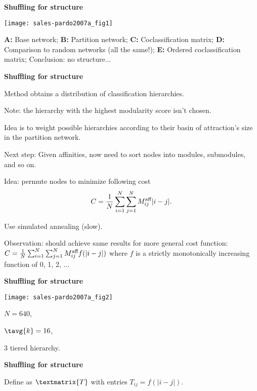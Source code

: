   \textbf{Shuffling for structure}

  \texttt{[image: sales-pardo2007a\_fig1]}

  
   
    \textbf{A:} 
    Base network;
    \textbf{B:} 
    Partition network;
    \textbf{C:} 
    Coclassification matrix;
    \textbf{D:} 
    Comparison to random networks (all the same!);
    \textbf{E:} 
    Ordered coclassification matrix;
    {
    Conclusion: no structure...
    }
  


  \textbf{Shuffling for structure}

  
   
    Method obtains a distribution of classification hierarchies.
  
    Note: the hierarchy with the highest modularity score
    isn't chosen.
  
    Idea is to weight possible hierarchies according
    to their basin of attraction's size in the partition network.
  
    \alert{Next step:} Given affinities, now need to
    sort nodes into modules, submodules, and so on.
  
    \alert{Idea:} permute nodes to minimize
    following cost
    $$
    C = \frac{1}{N} 
    \sum_{i=1}^{N}
    \sum_{j=1}^{N}
    M_{ij}^{\textnormal{aff}} | i - j|.
    $$
  
    Use simulated annealing (slow).
  
    \alert{Observation:} should achieve same results
    for more general cost function:
    $
    C = \frac{1}{N} 
    \sum_{i=1}^{N}
    \sum_{j=1}^{N}
    M_{ij}^{\textnormal{aff}} f(|i - j|)
    $
    where $f$ is a strictly monotonically increasing
    function of 0, 1, 2, ...
  


  \textbf{Shuffling for structure}

      
    \texttt{[image: sales-pardo2007a\_fig2]}
    
    
     
      $N=640$,
     
      $\tavg{k}=16$, 
     
      3 tiered hierarchy.
    
  

  \textbf{Shuffling for structure}

  
  
    Define  as $\textmatrix{T}$ with
    entries $T_{ij} = f(|i-j|)$.
  
